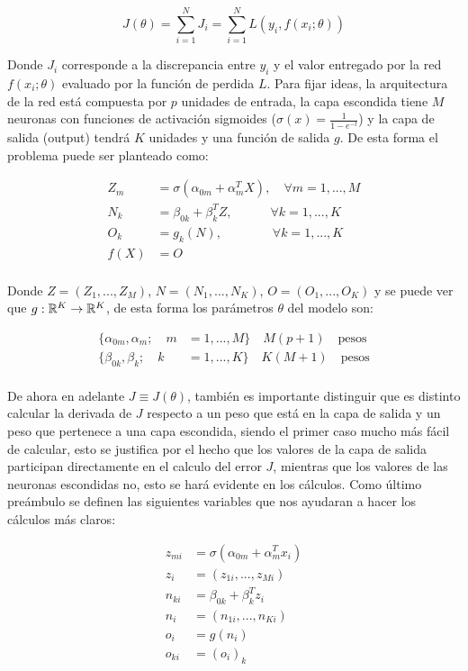 \begin{equation}
J(\theta) = \sum_{i=1}^N J_i = \sum_{i=1}^N L(y_i, f(x_i;\theta))
\end{equation}

Donde $J_i$ corresponde a la discrepancia entre $y_i$ y el valor entregado por la red $f(x_i;\theta)$ evaluado por la función de perdida $L$. Para fijar ideas, la arquitectura de la red está compuesta por $p$ unidades de entrada, la capa escondida tiene $M$ neuronas con funciones de activación sigmoides ($\sigma(x)=\frac{1}{1-e^{-t}}$) y la capa de salida (output) tendrá $K$ unidades y una función de salida $g$. De esta forma el problema puede ser planteado como:

\begin{align}
	Z_m &= \sigma(\alpha_{0m} + \alpha_{m}^TX), \quad \forall m=1,...,M\\
	N_k &= \beta_{0k} + \beta_k^TZ, \quad\quad\quad \forall k=1,...,K\\
	O_k &= g_k(N), \quad\quad\quad\quad \forall k=1,...,K\\
	f(X) &= O\\
\end{align}

Donde $Z=(Z_1,...,Z_M)$, $N=(N_1,...,N_K)$, $O=(O_1,...,O_K)$ y se puede ver que $g:\mathbb{R}^K \rightarrow \mathbb{R}^K$, de esta forma los parámetros $\theta$ del modelo son:

\begin{align}
\{\alpha_{0m}, \alpha_m; \quad m &= 1,...,M \} \quad M(p+1) \quad \text{pesos}\\
\{\beta_{0k}, \beta_k; \quad k &= 1,...,K \} \quad K(M+1) \quad \text{pesos}\\
\end{align}

De ahora en adelante $J\equiv J(\theta)$, también es importante distinguir que es distinto calcular la derivada de $J$ respecto a un peso que está en la capa de salida y un peso que pertenece a una capa escondida, siendo el primer caso mucho más fácil de calcular, esto se justifica por el hecho que los valores de la capa de salida participan directamente en el calculo del error $J$, mientras que los valores de las neuronas escondidas no, esto se hará evidente en los cálculos. Como último preámbulo se definen las siguientes variables que nos ayudaran a hacer los cálculos más claros:

\begin{align}
z_{mi} &= \sigma(\alpha_{0m} + \alpha_{m}^Tx_i)\\
z_i &= (z_{1i},...,z_{Mi})\\
n_{ki} &= \beta_{0k} + \beta_k^Tz_i\\
n_i &= (n_{1i},...,n_{Ki})\\
o_{i} &= g(n_i)\\
o_{ki} &= (o_i)_k\\
\end{align}

